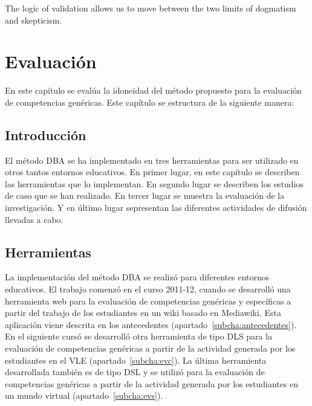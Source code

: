 

\begin{savequote}[50mm]
The logic of validation allows us to move between the two limits of dogmatism and skepticism. 
\end{savequote}


\chapter{Evaluación}
\label{cha:Validation of the methodology}

\ifpdf
    \graphicspath{{5_experiments_and_results/figures/PNG/}{5_experiments_and_results/figures/PDF/}{5_experiments_and_results/figures/}}
\else
    \graphicspath{{5_experiments_and_results/figures/EPS/}{5_experiments_and_results/figures/}}
\fi



En este capítulo se evalúa la idoneidad del método propuesto para la evaluación de competencias genéricas. Este capítulo se estructura de la siguiente manera:

\section{Introducción}

	El método DBA se ha implementado en tres herramientas para ser utilizado en otros tantos entornos educativos. En primer lugar, en este capítulo se describen las herramientas que lo implementan.  En segundo lugar se describen los estudios de caso que se han realizado. En tercer lugar se muestra la evaluación de la investigación. Y en último lugar sepresentan las diferentes actividades de difusión llevadas a cabo.

\section{Herramientas}

	La implementación del método DBA se realizó para diferentes entornos educativos. El trabajo comenzó en el curso 2011-12, cuando se desarrolló una herramienta web para la evaluación de competencias genéricas y específicas a partir del trabajo de los estudiantes en un wiki basado en Mediawiki. Esta aplicación viene descrita en los antecedentes (apartado~\ref{subcha:antecedentes}). En el siguiente cursó se desarrolló otra herramienta de tipo DLS para la evaluación de competencias genéricas a partir de la actividad generada por los estudiantes en el VLE (apartado~\ref{subcha:evc}). La última herramienta desarrollada también es de tipo DSL y se utilizó para la evaluación de competencias genéricas a partir de la actividad generada por los estudiantes en un mundo virtual (apartado~\ref{subcha:evs}).

